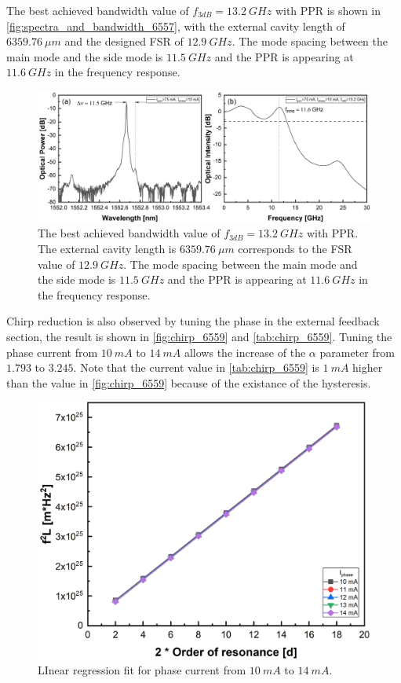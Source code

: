 The best achieved bandwidth value of $f_{3dB}=13.2 \ GHz$ with PPR is shown in \autoref{fig:spectra_and_bandwidth_6557}, with the external cavity length of $6359.76 \ \mu m$ and the designed FSR of $12.9 \ GHz$. The mode spacing between the main mode and the side mode is $11.5 \ GHz$ and the PPR is appearing at $11.6 \ GHz$ in the frequency response.

\begin{figure}[ht]
    \centering
    \includegraphics[width=\linewidth]{figures/spectrum_and_bandwidth_6557.png}
    \caption{The best achieved bandwidth value of $f_{3dB}=13.2 \ GHz$ with PPR. The external cavity length is $6359.76 \ \mu m$ corresponds to the FSR value of $12.9 \ GHz$. The mode spacing between the main mode and the side mode is $11.5 \ GHz$ and the PPR is appearing at $11.6 \ GHz$ in the frequency response.}
    \label{fig:spectra_and_bandwidth_6557}
\end{figure}

Chirp reduction is also observed by tuning the phase in the external feedback section, the result is shown in \autoref{fig:chirp_6559} and \autoref{tab:chirp_6559}. Tuning the phase current from $10 \ mA$ to $14 \ mA$ allows the increase of the $\alpha$ parameter from $1.793$ to $3.245$. Note that the current value in \autoref{tab:chirp_6559} is $1 \ mA$ higher than the value in \autoref{fig:chirp_6559} because of the existance of the hysteresis.

\begin{figure}[H]
    \centering
    \includegraphics[width=.7\linewidth]{figures/chirp_6559.png}
    \caption{LInear regression fit for phase current from $10 \ mA$ to $14 \ mA$.}
    \label{fig:chirp_6559}
\end{figure}

